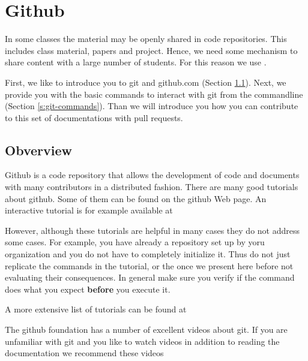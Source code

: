 
\chapter{Github}
\label{C:github}

\FILENAME

In some classes the material may be openly shared in code
repositories. This includes class material, papers and project.
Hence, we need some mechanism to share content with a large number of
students. For this reason we use .

First, we like to introduce you to git and github.com (Section
\ref{s:github}).  Next, we provide you with the basic commands to
interact with git from the commandline (Section
\ref{s:git-commands}). Than we will introduce you how you can
contribute to this set of documentations with pull requests.



\section{Obverview}\label{s:github}

Github is a code repository that allows the development of code and
documents with many contributors in a distributed fashion. There are
many good tutorials about github.  Some of them can be found on the
github Web page. An interactive tutorial is for example available at


However, although these tutorials are helpful in many cases they do
not address some cases. For example, you have already a repository set
up by yoru organization and you do not have to completely initialize
it. Thus do not just replicate the commands in the tutorial, or the
once we present here before not evaluating their consequences. In
general make sure you verify if the command does what you expect {\bf
  before} you execute it.

A more extensive list of tutorials can be found at


The github foundation has a number of excellent videos about git. If you
are unfamiliar with git and you like to watch videos in addition to
reading the documentation we recommend these videos


